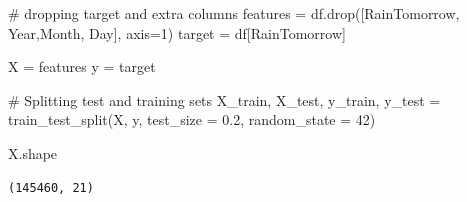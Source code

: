 \documentclass[
  letterpaper,
  DIV=11,
  numbers=noendperiod]{scrartcl}
\newenvironment{Shaded}{\begin{snugshade}}{\end{snugshade}}
\newcommand{\CommentTok}[1]{\textcolor[rgb]{0.37,0.37,0.37}{#1}}
\newcommand{\DecValTok}[1]{\textcolor[rgb]{0.68,0.00,0.00}{#1}}
\newcommand{\FloatTok}[1]{\textcolor[rgb]{0.68,0.00,0.00}{#1}}
\newcommand{\NormalTok}[1]{\textcolor[rgb]{0.00,0.23,0.31}{#1}}
\newcommand{\OperatorTok}[1]{\textcolor[rgb]{0.37,0.37,0.37}{#1}}
\newcommand{\StringTok}[1]{\textcolor[rgb]{0.13,0.47,0.30}{#1}}
\begin{document}
\begin{Shaded}
\begin{Highlighting}[]
\CommentTok{\# dropping target and extra columns}
\NormalTok{features }\OperatorTok{=}\NormalTok{ df.drop([}\StringTok{\textquotesingle{}RainTomorrow\textquotesingle{}}\NormalTok{, }\StringTok{\textquotesingle{}Year\textquotesingle{}}\NormalTok{,}\StringTok{\textquotesingle{}Month\textquotesingle{}}\NormalTok{, }\StringTok{\textquotesingle{}Day\textquotesingle{}}\NormalTok{], axis}\OperatorTok{=}\DecValTok{1}\NormalTok{) }
\NormalTok{target }\OperatorTok{=}\NormalTok{ df[}\StringTok{\textquotesingle{}RainTomorrow\textquotesingle{}}\NormalTok{]}

\NormalTok{X }\OperatorTok{=}\NormalTok{ features}
\NormalTok{y }\OperatorTok{=}\NormalTok{ target}

\CommentTok{\# Splitting test and training sets}
\NormalTok{X\_train, X\_test, y\_train, y\_test }\OperatorTok{=}\NormalTok{ train\_test\_split(X, y, test\_size }\OperatorTok{=} \FloatTok{0.2}\NormalTok{, random\_state }\OperatorTok{=} \DecValTok{42}\NormalTok{)}

\NormalTok{X.shape}
\end{Highlighting}
\end{Shaded}

\begin{verbatim}
(145460, 21)
\end{verbatim}
\end{document}
